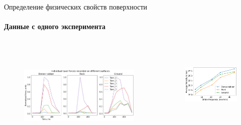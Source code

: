 \documentclass[aspectratio=169,xcolor=table]{beamer}
\begin{document}
\begin{frame}[t]{Определение физических свойств поверхности}
    \framesubtitle{Данные с одного эксперимента}
    \begin{columns}[T,onlytextwidth]
        \begin{column}{0.60\textwidth}
            \begin{figure}[H]
                \centering\includegraphics[height=5cm,width=1\textwidth,keepaspectratio]{s_shape_leg/TaxelIndForce.png}
            \end{figure}
        \end{column}
        \begin{column}{0.35\textwidth}
            \vspace{-1.4cm}
            \begin{figure}[H]
                \centering\includegraphics[height=3.8cm,width=1\textwidth,keepaspectratio]{s_shape_leg/avg_lin_vel_rev_min.png}
            \end{figure}


\end{column}
\end{columns}
\end{frame}
\end{document}
